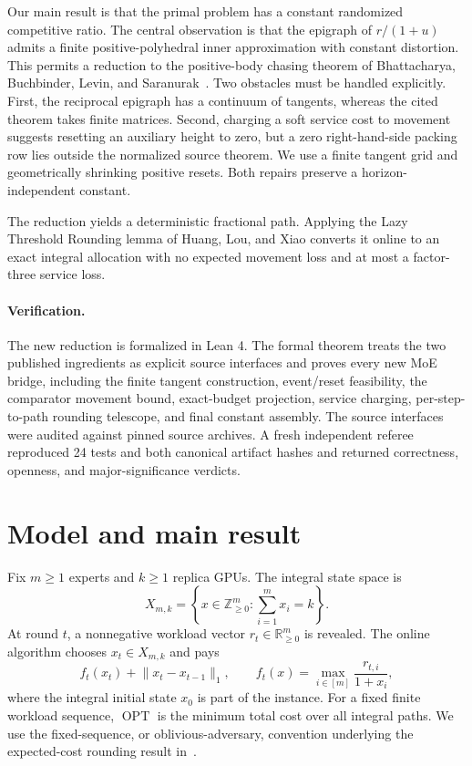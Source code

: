 \documentclass[11pt]{article}
\theoremstyle{remark}
\newcommand{\R}{\mathbb R}
\newcommand{\Z}{\mathbb Z}
\newcommand{\OPT}{\operatorname{OPT}}
\begin{document}
Our main result is that the primal problem has a constant randomized
competitive ratio.  The central observation is that the epigraph of
$r/(1+u)$ admits a finite positive-polyhedral inner approximation with constant
distortion.  This permits a reduction to the positive-body chasing theorem of
Bhattacharya, Buchbinder, Levin, and Saranurak~\cite{BBLS2023}.  Two obstacles
must be handled explicitly.  First, the reciprocal epigraph has a continuum of
tangents, whereas the cited theorem takes finite matrices.  Second, charging a
soft service cost to movement suggests resetting an auxiliary height to zero,
but a zero right-hand-side packing row lies outside the normalized source
theorem.  We use a finite tangent grid and geometrically shrinking positive
resets.  Both repairs preserve a horizon-independent constant.

The reduction yields a deterministic fractional path.  Applying the Lazy
Threshold Rounding lemma of Huang, Lou, and Xiao converts it online to an exact
integral allocation with no expected movement loss and at most a factor-three
service loss.

\paragraph{Verification.}
The new reduction is formalized in Lean 4.  The formal theorem treats the two
published ingredients as explicit source interfaces and proves every new MoE
bridge, including the finite tangent construction, event/reset feasibility,
the comparator movement bound, exact-budget projection, service charging,
per-step-to-path rounding telescope, and final constant assembly.
The source interfaces were audited against pinned source archives.  A fresh
independent referee reproduced 24 tests and both canonical artifact hashes and
returned correctness, openness, and major-significance verdicts.

\section{Model and main result}

Fix $m\geq1$ experts and $k\geq1$ replica GPUs.  The integral state space is
\[
 X_{m,k}=\left\{x\in\Z_{\geq0}^{m}:\sum_{i=1}^{m}x_i=k\right\}.
\]
At round $t$, a nonnegative workload vector $r_t\in\R_{\geq0}^{m}$ is
revealed.  The online algorithm chooses $x_t\in X_{m,k}$ and pays
\[
 f_t(x_t)+\lVert x_t-x_{t-1}\rVert_1,
 \qquad
 f_t(x)=\max_{i\in[m]}\frac{r_{t,i}}{1+x_i},
\]
where the integral initial state $x_0$ is part of the instance.  For a fixed
finite workload sequence, $\OPT$ is the minimum total cost over all integral
paths.  We use the fixed-sequence, or oblivious-adversary, convention underlying
the expected-cost rounding result in~\cite{HLX2026}.
\end{document}
